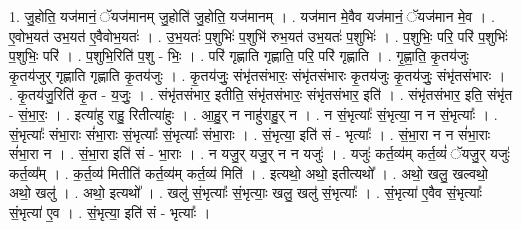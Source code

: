 \documentclass[17pt]{extarticle}
\begin{document}
1. जु॒होति॒ यज॑मानं॒ ॅयज॑मानम् जु॒होति॑ जु॒होति॒ यज॑मानम् । . यज॑मान मे॒वैव यज॑मानं॒ ॅयज॑मान मे॒व । . ए॒वोभ॒यत॑ उभ॒यत॑ ए॒वैवोभ॒यतः॑ । . उ॒भ॒यतः॑ प॒शुभिः॑ प॒शुभि॑ रुभ॒यत॑ उभ॒यतः॑ प॒शुभिः॑ । . प॒शुभिः॒ परि॒ परि॑ प॒शुभिः॑ प॒शुभिः॒ परि॑ । . प॒शुभि॒रिति॑ प॒शु - भिः॒ । . परि॑ गृह्णाति गृह्णाति॒ परि॒ परि॑ गृह्णाति । . गृ॒ह्णा॒ति॒ कृ॒तय॑जुः कृ॒तय॑जुर् गृह्णाति गृह्णाति कृ॒तय॑जुः । . कृ॒तय॑जुः॒ संभृ॑तसंभारः॒ संभृ॑तसंभारः कृ॒तय॑जुः कृ॒तय॑जुः॒ संभृ॑तसंभारः । . कृ॒तय॑जु॒रिति॑ कृ॒त - य॒जुः॒ । . संभृ॑तसंभार॒ इतीति॒ संभृ॑तसंभारः॒ संभृ॑तसंभार॒ इति॑ । . संभृ॑तसंभार॒ इति॒ संभृ॑त - सं॒भा॒रः॒ । . इत्या॑हु राहु॒ रितीत्या॑हुः । . आ॒हु॒र् न नाहु॑राहु॒र् न । . न सं॒भृत्याः᳚ सं॒भृत्या॒ न न सं॒भृत्याः᳚ । . सं॒भृत्याः᳚ संभा॒राः सं॑भा॒राः सं॒भृत्याः᳚ सं॒भृत्याः᳚ संभा॒राः । . सं॒भृत्या॒ इति॑ सं - भृत्याः᳚ । . सं॒भा॒रा न न सं॑भा॒राः सं॑भा॒रा न । . सं॒भा॒रा इति॑ सं - भा॒राः । . न यजु॒र् यजु॒र् न न यजुः॑ । . यजुः॑ कर्त॒व्य॑म् कर्त॒व्यं॑ ॅयजु॒र् यजुः॑ कर्त॒व्य᳚म् । . क॒र्त॒व्य॑ मितीति॑ कर्त॒व्य॑म् कर्त॒व्य॑ मिति॑ । . इत्यथो॒ अथो॒ इतीत्यथो᳚ । . अथो॒ खलु॒ खल्वथो॒ अथो॒ खलु॑ । . अथो॒ इत्यथो᳚ । . खलु॑ सं॒भृत्याः᳚ सं॒भृत्याः॒ खलु॒ खलु॑ सं॒भृत्याः᳚ । . सं॒भृत्या॑ ए॒वैव सं॒भृत्याः᳚ सं॒भृत्या॑ ए॒व । . सं॒भृत्या॒ इति॑ सं - भृत्याः᳚ । \newline
\end{document}
